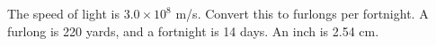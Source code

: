  The speed of light is $3.0\times10^8$  m/s. Convert
this to furlongs per fortnight.  A furlong is 220 yards, and
a fortnight is 14 days.  An inch is 2.54 cm.\answercheck\hwendpart
